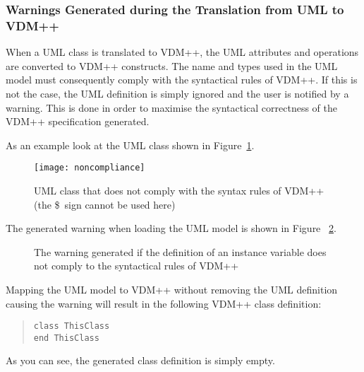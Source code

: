 \documentclass[\pformat,12pt]{article}
\newcommand{\vdmpp}{VDM++}
\begin{document}
\subsubsection*{Warnings Generated during the Translation from UML to \vdmpp{}}

When a UML class is translated to \vdmpp{}, the UML attributes and
operations are converted to \vdmpp{} constructs.  The name and types
used in the UML model must consequently comply with the syntactical
rules of \vdmpp{}. If this is not the case, the UML definition is
simply ignored and the user is notified by a warning.  This is done in
order to maximise the syntactical correctness of the \vdmpp{}
specification generated.

As an example look at the UML class shown in Figure~\ref{fig:noncompliance}.

\begin{figure}[htb]
\begin{center}
\mbox{}
\vspace{0.5cm}
\texttt{[image: noncompliance]}
\caption{UML class that does not comply with the syntax 
rules of \vdmpp{} (the \$\ sign cannot be used here)\label{fig:noncompliance}}
\end{center}
\end{figure}

The generated warning when loading the UML model is shown in Figure ~\ref{fig:warning}.
\begin{figure}[htb]
\begin{center}
\mbox{}
\vspace{0.5cm}
\caption{The warning generated if the definition of an instance
  variable does not comply to the syntactical rules of \vdmpp{}\label{fig:warning}}
\end{center}
\end{figure}
Mapping the UML model to \vdmpp{} without removing the UML definition
causing the warning will result in the following \vdmpp{} class
definition:

\begin{quote}
\begin{verbatim}
class ThisClass
end ThisClass
\end{verbatim}
\end{quote}

As you can see, the generated class definition is simply empty.
\end{document}
